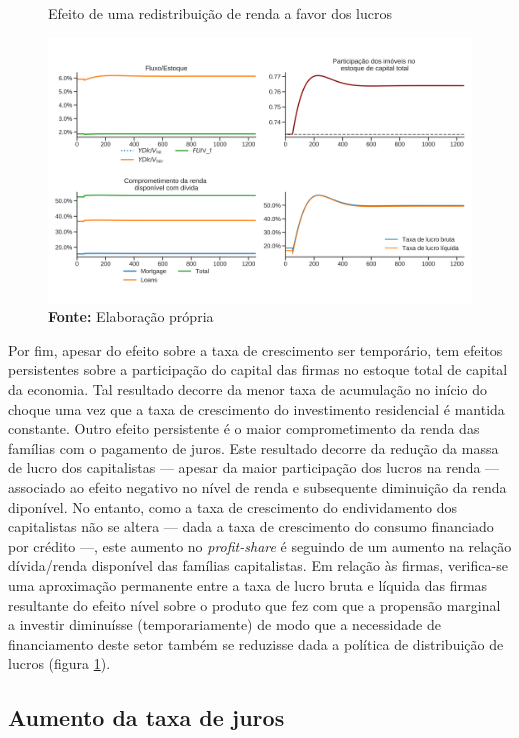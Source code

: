 \begin{figure}[H]
	\centering
	\caption{Efeito de uma redistribuição de renda a favor dos lucros}
	\label{choque_2Norms}
	\includegraphics[width=\textwidth]{../../Modelo/Versoes/Shock_2Norms.png}
	\caption*{\textbf{Fonte:} Elaboração própria}
\end{figure}

Por fim, apesar do efeito sobre a taxa de crescimento ser temporário, tem efeitos persistentes sobre a participação do capital das firmas no estoque total de capital da economia. Tal resultado decorre da menor taxa de acumulação no início do choque uma vez que a taxa de crescimento do investimento residencial é mantida constante. 
Outro efeito persistente é o maior comprometimento da renda das famílias com o pagamento de juros. 
Este resultado decorre da redução da massa de lucro dos capitalistas  --- apesar da maior participação dos lucros na renda --- associado ao efeito negativo no nível de renda e subsequente diminuição da renda diponível.
No entanto, como a taxa de crescimento do endividamento dos capitalistas não se altera --- dada a taxa de crescimento do consumo financiado por crédito ---, este aumento no \textit{profit-share} é seguindo de um aumento na relação dívida/renda disponível das famílias capitalistas.
Em relação às firmas, verifica-se uma aproximação permanente entre a taxa de lucro bruta e líquida das firmas resultante do efeito nível sobre o produto que fez com que a propensão marginal a investir diminuísse (temporariamente) de modo que a necessidade de financiamento deste setor também se reduzisse dada a política de distribuição de lucros (figura \ref{choque_2Norms}).

\subsection*{Aumento da taxa de juros}

